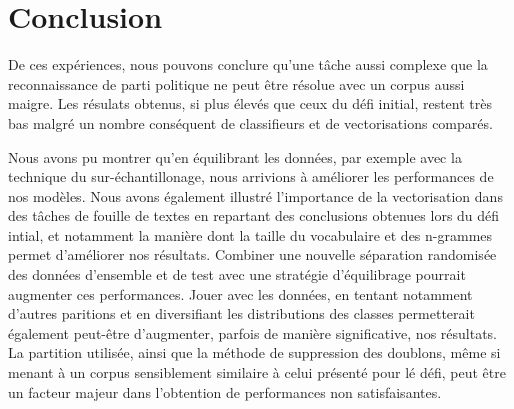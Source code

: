 \documentclass[11pt]{article}
\begin{document}
\section{Conclusion}

De ces expériences, nous pouvons conclure qu'une tâche aussi complexe que la reconnaissance de parti politique ne peut être résolue avec un corpus aussi maigre. Les résulats obtenus, si plus élevés que ceux du défi initial, restent très bas malgré un nombre conséquent de classifieurs et de vectorisations comparés.


Nous avons pu montrer qu'en équilibrant les données, par exemple avec la technique du sur-échantillonage, nous arrivions à améliorer les performances de nos modèles. Nous avons également illustré l'importance de la vectorisation dans des tâches de fouille de textes en repartant des conclusions obtenues lors du défi intial, et notamment la manière dont la taille du vocabulaire et des n-grammes permet d'améliorer nos résultats. Combiner une nouvelle séparation randomisée des données d'ensemble et de test avec une stratégie d'équilibrage pourrait augmenter ces performances. Jouer avec les données, en tentant notamment d'autres paritions et en diversifiant les distributions des classes permetterait également peut-être d'augmenter, parfois de manière significative, nos résultats. La partition utilisée, ainsi que la méthode de suppression des doublons, même si menant à un corpus sensiblement similaire à celui présenté pour lé défi, peut être un facteur majeur dans l'obtention de performances non satisfaisantes.



\end{document}
